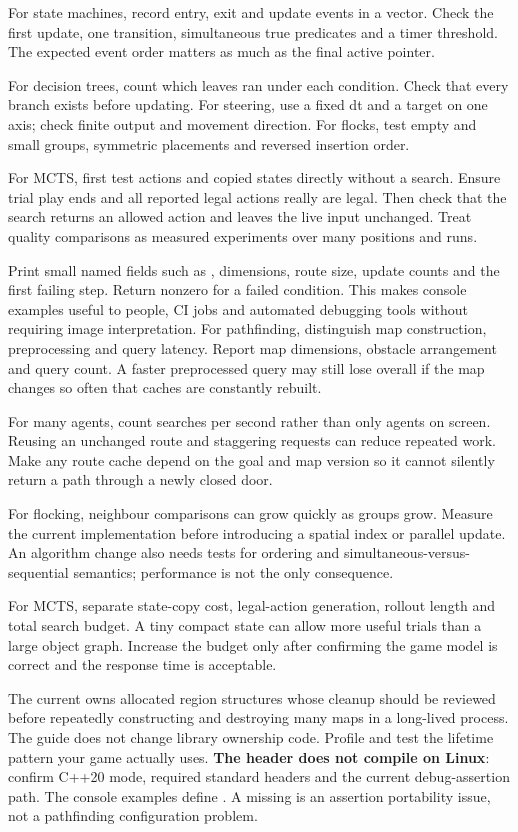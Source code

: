 \documentclass[11pt,a4paper]{article}
\begin{document}
For state machines, record entry, exit and update events in a vector. Check the first update, one transition, simultaneous true predicates and a timer threshold. The expected event order matters as much as the final active pointer.

For decision trees, count which leaves ran under each condition. Check that every branch exists before updating. For steering, use a fixed dt and a target on one axis; check finite output and movement direction. For flocks, test empty and small groups, symmetric placements and reversed insertion order.

For MCTS, first test actions and copied states directly without a search. Ensure trial play ends and all reported legal actions really are legal. Then check that the search returns an allowed action and leaves the live input unchanged. Treat quality comparisons as measured experiments over many positions and runs.

Print small named fields such as , dimensions, route size, update counts and the first failing step. Return nonzero for a failed condition. This makes console examples useful to people, CI jobs and automated debugging tools without requiring image interpretation.
For pathfinding, distinguish map construction, preprocessing and query latency. Report map dimensions, obstacle arrangement and query count. A faster preprocessed query may still lose overall if the map changes so often that caches are constantly rebuilt.

For many agents, count searches per second rather than only agents on screen. Reusing an unchanged route and staggering requests can reduce repeated work. Make any route cache depend on the goal and map version so it cannot silently return a path through a newly closed door.

For flocking, neighbour comparisons can grow quickly as groups grow. Measure the current implementation before introducing a spatial index or parallel update. An algorithm change also needs tests for ordering and simultaneous-versus-sequential semantics; performance is not the only consequence.

For MCTS, separate state-copy cost, legal-action generation, rollout length and total search budget. A tiny compact state can allow more useful trials than a large object graph. Increase the budget only after confirming the game model is correct and the response time is acceptable.

The current  owns allocated region structures whose cleanup should be reviewed before repeatedly constructing and destroying many maps in a long-lived process. The guide does not change library ownership code. Profile and test the lifetime pattern your game actually uses.
\textbf{The header does not compile on Linux}: confirm C++20 mode, required standard headers and the current debug-assertion path. The console examples define . A missing  is an assertion portability issue, not a pathfinding configuration problem.
\end{document}
